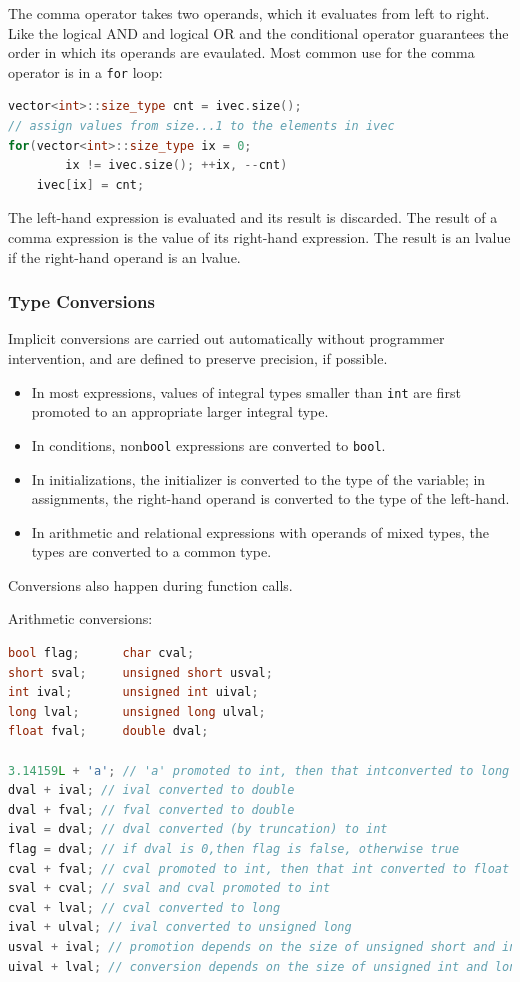 The comma operator takes two operands, which it evaluates from left to right. Like the logical AND and logical OR and the conditional operator guarantees the order in which its operands are evaulated. Most common use for the comma operator is in a \texttt{for} loop:
\begin{lstlisting}[language=C++]
vector<int>::size_type cnt = ivec.size(); 
// assign values from size...1 to the elements in ivec 
for(vector<int>::size_type ix = 0; 
        ix != ivec.size(); ++ix, --cnt) 
    ivec[ix] = cnt;
\end{lstlisting}
The left-hand expression is evaluated and its result is discarded. The result of a comma expression is the value of its right-hand expression. The result is an lvalue if the right-hand operand is an lvalue.

\subsubsection{Type Conversions}

Implicit conversions are carried out automatically without programmer intervention, and are defined to preserve precision, if possible. 
\begin{itemize}
    \item In most expressions, values of integral types smaller than \texttt{int} are first promoted to an appropriate larger integral type.
    \item In conditions, non\texttt{bool} expressions are converted to \texttt{bool}.
    \item In initializations, the initializer is converted to the type of the variable; in assignments, the right-hand operand is converted to the type of the left-hand.
    \item In arithmetic and relational expressions with operands of mixed types, the types are converted to a common type.
\end{itemize}
Conversions also happen during function calls.

Arithmetic conversions:
\begin{lstlisting}[language=C++]
bool flag;      char cval; 
short sval;     unsigned short usval; 
int ival;       unsigned int uival; 
long lval;      unsigned long ulval; 
float fval;     double dval; 

3.14159L + 'a'; // 'a' promoted to int, then that intconverted to long double 
dval + ival; // ival converted to double 
dval + fval; // fval converted to double 
ival = dval; // dval converted (by truncation) to int 
flag = dval; // if dval is 0,then flag is false, otherwise true 
cval + fval; // cval promoted to int, then that int converted to float 
sval + cval; // sval and cval promoted to int
cval + lval; // cval converted to long 
ival + ulval; // ival converted to unsigned long 
usval + ival; // promotion depends on the size of unsigned short and int 
uival + lval; // conversion depends on the size of unsigned int and long
\end{lstlisting}

